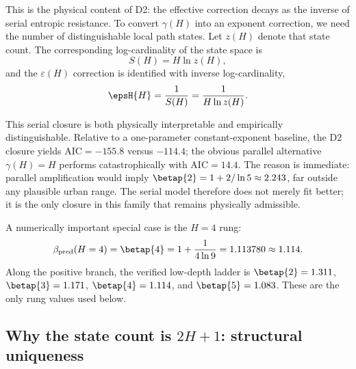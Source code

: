 This is the physical content of D2: the effective correction decays as the
inverse of serial entropic resistance.
To convert \(\gamma(H)\) into an exponent correction, we need the number of
distinguishable local path states.
Let \(z(H)\) denote that state count.
The corresponding log-cardinality of the state space is
\begin{equation}
S(H)=H\ln z(H),
\label{eq:entropy}
\end{equation}
and the $\varepsilon(H)$ correction is identified with inverse log-cardinality,
\begin{equation}
\epsH{H}=\frac{1}{S(H)}=\frac{1}{H\ln z(H)}.
\label{eq:epsilon_general}
\end{equation}

This serial closure is both physically interpretable and empirically
distinguishable.
Relative to a one-parameter constant-exponent baseline, the D2 closure yields
\(\mathrm{AIC}=-155.8\) versus \(-114.4\); the obvious parallel alternative
\(\gamma(H)=H\) performs catastrophically with \(\mathrm{AIC}=14.4\).
The reason is immediate:
parallel amplification would imply
\(\betap{2}=1+2/\ln 5\approx 2.243\), far outside any plausible urban range.
The serial model therefore does not merely fit better; it is the only closure
in this family that remains physically admissible.

A numerically important special case is the \(H=4\) rung:
\begin{equation}
\beta_{\mathrm{pred}}(H=4)=\betap{4}=1+\frac{1}{4\ln 9}=1.113780\approx 1.114.
\label{eq:h4_pred}
\end{equation}
Along the positive branch, the verified low-depth ladder is
\(\betap{2}=1.311\), \(\betap{3}=1.171\), \(\betap{4}=1.114\), and
\(\betap{5}=1.083\).
These are the only rung values used below.

\subsection{Why the state count is \(2H+1\): structural uniqueness}\label{subsec:structural_uniqueness}

